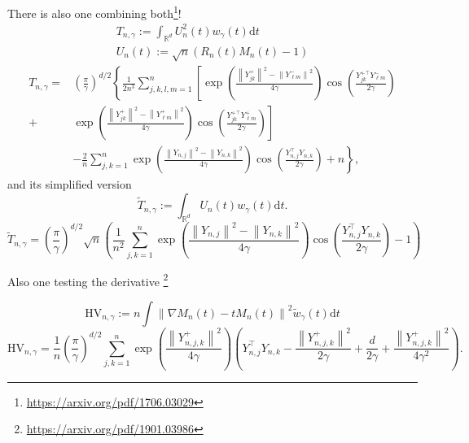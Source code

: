 There is also one combining both\footnote{\url{https://arxiv.org/pdf/1706.03029}}!
\begin{equation}
    \begin{array}{l}
T_{n, \gamma}:=\int_{\mathbb{R}^{d}} U_{n}^{2}(t) w_{\gamma}(t) \mathrm{d} t\\
U_{n}(t):=\sqrt{n}\left(R_{n}(t) M_{n}(t)-1\right)
\end{array}
\end{equation}
\begin{equation}
    \begin{aligned}
T_{n, \gamma}= & \left(\frac{\pi}{\gamma}\right)^{d / 2}\left\{\frac { 1 } { 2 n ^ { 3 } } \sum _ { j , k , l , m = 1 } ^ { n } \left[\exp \left(\frac{\left\|Y_{j k}^{+}\right\|^{2}-\left\|Y_{\ell m}^{-}\right\|^{2}}{4 \gamma}\right) \cos \left(\frac{Y_{j k}^{+\top} Y_{\ell m}^{-}}{2 \gamma}\right)\right.\right. \\
+ & \left.\exp \left(\frac{\left\|Y_{j k}^{+}\right\|^{2}-\left\|Y_{\ell m}^{+}\right\|^{2}}{4 \gamma}\right) \cos \left(\frac{Y_{j k}^{+\top} Y_{\ell m}^{+}}{2 \gamma}\right)\right] \\
& \left.-\frac{2}{n} \sum_{j, k=1}^{n} \exp \left(\frac{\left\|Y_{n, j}\right\|^{2}-\left\|Y_{n, k}\right\|^{2}}{4 \gamma}\right) \cos \left(\frac{Y_{n, j}^{\top} Y_{n, k}}{2 \gamma}\right)+n\right\},
\end{aligned}
\end{equation}
and its simplified version
\begin{equation}
    \widetilde{T}_{n, \gamma}:=\int_{\mathbb{R}^{d}} U_{n}(t) w_{\gamma}(t) \mathrm{d} t .
\end{equation}
\begin{equation}
    \widetilde{T}_{n, \gamma}=\left(\frac{\pi}{\gamma}\right)^{d / 2} \sqrt{n}\left(\frac{1}{n^{2}} \sum_{j, k=1}^{n} \exp \left(\frac{\left\|Y_{n, j}\right\|^{2}-\left\|Y_{n, k}\right\|^{2}}{4 \gamma}\right) \cos \left(\frac{Y_{n, j}^{\top} Y_{n, k}}{2 \gamma}\right)-1\right)
\end{equation}


Also one testing the derivative \footnote{\url{https://arxiv.org/pdf/1901.03986}}

\begin{equation}
    \mathrm{HV}_{n, \gamma}:=n \int\left\|\nabla M_{n}(t)-t M_{n}(t)\right\|^{2} \widetilde{w}_{\gamma}(t) \mathrm{d} t
\end{equation}
\begin{equation}\mathrm{HV}_{n, \gamma}=\frac{1}{n}\left(\frac{\pi}{\gamma}\right)^{d / 2} \sum_{j, k=1}^{n} \exp \left(\frac{\left\|Y_{n, j, k}^{+}\right\|^{2}}{4 \gamma}\right)
\left(Y_{n, j}^{\top} Y_{n, k}-\frac{\left\|Y_{n, j, k}^{+}\right\|^{2}}{2 \gamma}+\frac{d}{2 \gamma}+\frac{\left\|Y_{n, j, k}^{+}\right\|^{2}}{4 \gamma^{2}}\right) .
\end{equation}


